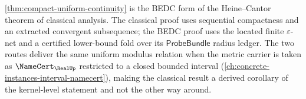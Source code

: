 \begin{remark}
\label{rem:compact-uniform-heine-cantor}
\autoref{thm:compact-uniform-continuity} is the BEDC form of the Heine--Cantor theorem of classical analysis. The classical proof uses sequential compactness and an extracted convergent subsequence; the BEDC proof uses the located finite $\varepsilon$-net and a certified lower-bound fold over its $\mathsf{ProbeBundle}$ radius ledger. The two routes deliver the same uniform modulus relation when the metric carrier is taken as $\NameCert_{\RealUp}$ restricted to a closed bounded interval (\autoref{ch:concrete-instances-interval-namecert}), making the classical result a derived corollary of the kernel-level statement and not the other way around.
\end{remark}

